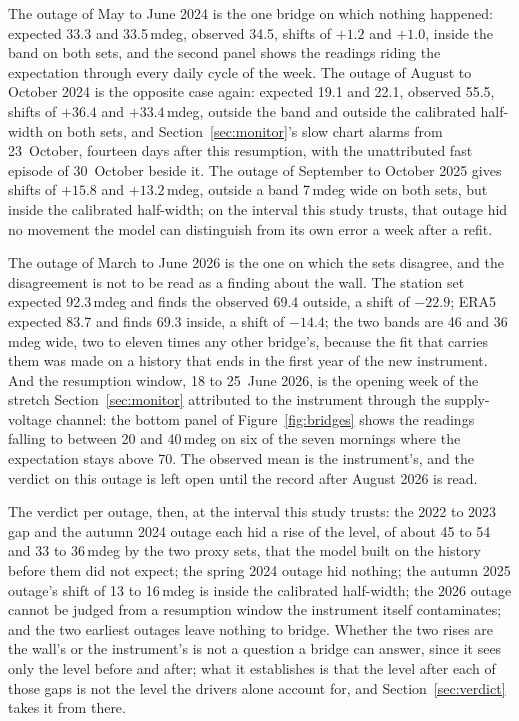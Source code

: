 \documentclass[11pt,a4paper]{article}
\begin{document}
The outage of May to June 2024 is the one bridge on which nothing happened:
expected 33.3 and 33.5\,mdeg, observed 34.5, shifts of $+1.2$ and $+1.0$,
inside the band on both sets, and the second panel shows the readings riding
the expectation through every daily cycle of the week. The outage of
August to October 2024 is the opposite case again: expected 19.1 and 22.1,
observed 55.5, shifts of $+36.4$ and $+33.4$\,mdeg, outside the band and
outside the calibrated half-width on both sets, and Section~\ref{sec:monitor}'s
slow chart alarms from 23~October, fourteen days after this resumption, with
the unattributed fast episode of 30~October beside it. The outage of
September to October 2025 gives shifts of $+15.8$ and $+13.2$\,mdeg, outside
a band 7\,mdeg wide on both sets, but inside the calibrated half-width; on
the interval this study trusts, that outage hid no movement the model can
distinguish from its own error a week after a refit.

The outage of March to June 2026 is the one on which the sets disagree, and
the disagreement is not to be read as a finding about the wall. The station
set expected 92.3\,mdeg and finds the observed 69.4 outside, a shift of
$-22.9$; ERA5 expected 83.7 and finds 69.3 inside, a shift of $-14.4$; the
two bands are 46 and 36\,mdeg wide, two to eleven times any other bridge's,
because the fit that carries them was made on a history that ends in the
first year of the new instrument. And the resumption window, 18 to 25~June
2026, is the opening week of the stretch Section~\ref{sec:monitor} attributed
to the instrument through the supply-voltage channel: the bottom panel of
Figure~\ref{fig:bridges} shows the readings falling to between 20 and
40\,mdeg on six of the seven mornings where the expectation stays above
70. The observed mean is the instrument's, and the verdict on this outage is
left open until the record after August 2026 is read.

The verdict per outage, then, at the interval this study trusts: the 2022 to
2023 gap and the autumn 2024 outage each hid a rise of the level, of about 45
to 54 and 33 to 36\,mdeg by the two proxy sets, that the model built on the
history before them did not expect; the spring 2024 outage hid nothing; the
autumn 2025 outage's shift of 13 to 16\,mdeg is inside the calibrated
half-width; the 2026 outage cannot be judged from a resumption window the
instrument itself contaminates; and the two earliest outages leave nothing to
bridge. Whether the two rises are the wall's or the instrument's is not a
question a bridge can answer, since it sees only the level before and after;
what it establishes is that the level after each of those gaps is not the
level the drivers alone account for, and Section~\ref{sec:verdict} takes it
from there.
\end{document}
